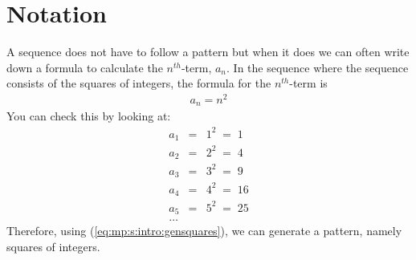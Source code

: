 \documentclass[10pt,a4paper,titlepage,twoside,openright]{report}
\begin{document}
\section{Notation}

A sequence does not have to follow a pattern but when it does we can often write down a formula to calculate the $n^{th}$-term, $a_n$. In the sequence
where the sequence consists of the squares of integers, the formula for the $n^{th}$-term is
\begin{eqnarray}
\label{eq:mp:s:intro:gensquares}
a_n = n^2
\end{eqnarray}
You can check this by looking at:
\begin{eqnarray*}
a_1 &=& 1^2 \; = \; 1 \\
a_2 &=& 2^2 \; = \; 4 \\
a_3 &=& 3^2 \; = \; 9 \\
a_4 &=& 4^2 \; = \; 16 \\
a_5 &=& 5^2 \; = \; 25 \\
\ldots
\end{eqnarray*}
Therefore, using (\ref{eq:mp:s:intro:gensquares}), we can generate a pattern, namely squares of integers.
\end{document}
